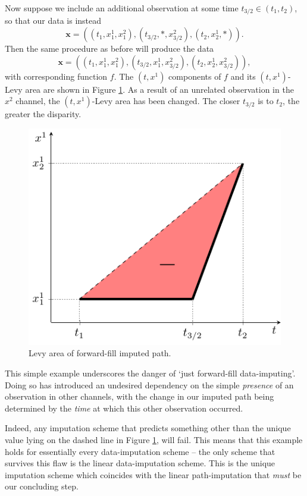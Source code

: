\documentclass{article}
\begin{document}
Now suppose we include an additional observation at some time $t_{3/2} \in (t_1, t_2)$, so that our data is instead
\begin{equation}\label{eq:flaw2}
    \mathbf{x} = ((t_1, x_1^1, x_1^2), (t_{3/2}, *, x_{3/2}^2), (t_2, x_2^1, *)).
\end{equation}
Then the same procedure as before will produce the data
\begin{equation*}
    \mathbf{x} = ((t_1, x_1^1, x_1^2), (t_{3/2}, x_1^1, x_{3/2}^2), (t_2, x_2^1, x_{3/2}^2)),
\end{equation*}
with corresponding function $f$. The $(t, x^1)$ components of $f$ and its $(t, x^1)$-Levy area are shown in Figure \ref{fig:bentline}. As a result of an unrelated observation in the $x^2$ channel, the $(t, x^1)$-Levy area has been changed. The closer $t_{3/2}$ is to $t_2$, the greater the disparity.
\begin{figure}
    \centering
    \includegraphics[width=0.45 \columnwidth]{figures/sig_path3.pdf}
    \caption{Levy area of forward-fill imputed path.}\label{fig:bentline}
    \vspace{-1em}
\end{figure}

This simple example underscores the danger of `just forward-fill data-imputing'. Doing so has introduced an undesired dependency on the simple \emph{presence} of an observation in other channels, with the change in our imputed path being determined by the \emph{time} at which this other observation occurred.

Indeed, any imputation scheme that predicts something other than the unique value lying on the dashed line in Figure \ref{fig:bentline}, will fail. This means that this example holds for essentially every data-imputation scheme -- the only scheme that survives this flaw is the linear data-imputation scheme. This is the unique imputation scheme which coincides with the linear path-imputation that \emph{must} be our concluding step.
\end{document}
